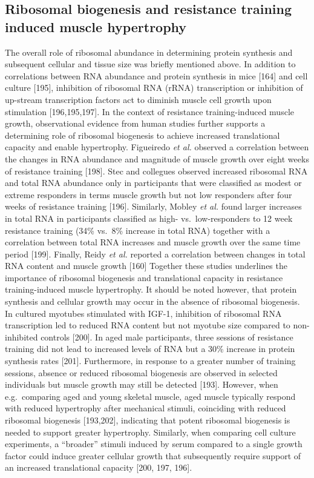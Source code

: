 \documentclass[twoside,10pt]{gihclass} %
\begin{document}
\hypertarget{ribosomal-biogenesis-and-resistance-training-induced-muscle-hypertrophy}{%
\subsection{Ribosomal biogenesis and resistance training induced muscle hypertrophy}\label{ribosomal-biogenesis-and-resistance-training-induced-muscle-hypertrophy}}

The overall role of ribosomal abundance in determining protein synthesis and subsequent cellular and tissue size was briefly mentioned above.
In addition to correlations between RNA abundance and protein synthesis in mice
{[}164{]}
and cell culture
{[}195{]},
inhibition of ribosomal RNA (rRNA) transcription or inhibition of up-stream transcription factors act to diminish muscle cell growth upon stimulation
{[}196,195,197{]}.
In the context of resistance training-induced muscle growth, observational evidence from human studies further supports a determining role of ribosomal biogenesis to achieve increased translational capacity and enable hypertrophy.
Figueiredo \emph{et al.} observed a correlation between the changes in RNA abundance and magnitude of muscle growth over eight weeks of resistance training
{[}198{]}.
Stec and collegues observed increased ribosomal RNA and total RNA abundance only in participants that were classified as modest or extreme responders in terms muscle growth but not low responders after four weeks of resistance training
{[}196{]}.
Similarly, Mobley \emph{et al.} found larger increases in total RNA in participants classified as high- vs.~low-responders to 12 week resistance training (34\% vs.~8\% increase in total RNA) together with a correlation between total RNA increases and muscle growth over the same time period
{[}199{]}.
Finally, Reidy \emph{et al.} reported a correlation between changes in total RNA content and muscle growth
{[}160{]}
Together these studies underlines the importance of ribosomal biogenesis and translational capacity in resistance training-induced muscle hypertrophy.
It should be noted however, that protein synthesis and cellular growth may occur in the absence of ribosomal biogenesis.
In cultured myotubes stimulated with IGF-1, inhibition of ribosomal RNA transcription led to reduced RNA content but not myotube size compared to non-inhibited controls
{[}200{]}.
In aged male participants, three sessions of resistance training did not lead to increased levels of RNA but a 30\% increase in protein synthesis rates
{[}201{]}.
Furthermore, in response to a greater number of training sessions, absence or reduced ribosomal biogenesis are observed in selected individuals but muscle growth may still be detected
{[}193{]}.
However, when e.g.~comparing aged and young skeletal muscle, aged muscle typically respond with reduced hypertrophy after mechanical stimuli, coinciding with reduced ribosomal biogenesis
{[}193,202{]},
indicating that potent ribosomal biogenesis is needed to support greater hypertrophy.
Similarly, when comparing cell culture experiments, a ``broader'' stimuli induced by serum compared to a single growth factor could induce greater cellular growth that subsequently require support of an increased translational capacity
{[}200, 197, 196{]}.
\end{document}
